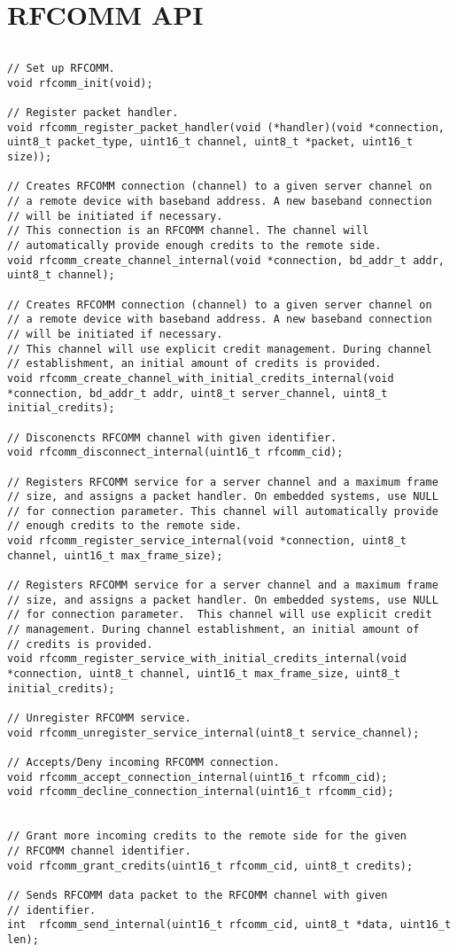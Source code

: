 \section{RFCOMM API}
\label{appendix:api_rfcomm}
$ $
\begin{lstlisting}
// Set up RFCOMM.
void rfcomm_init(void);

// Register packet handler.
void rfcomm_register_packet_handler(void (*handler)(void *connection, uint8_t packet_type, uint16_t channel, uint8_t *packet, uint16_t size));

// Creates RFCOMM connection (channel) to a given server channel on 
// a remote device with baseband address. A new baseband connection 
// will be initiated if necessary.
// This connection is an RFCOMM channel. The channel will 
// automatically provide enough credits to the remote side.
void rfcomm_create_channel_internal(void *connection, bd_addr_t addr, uint8_t channel);

// Creates RFCOMM connection (channel) to a given server channel on
// a remote device with baseband address. A new baseband connection
// will be initiated if necessary. 
// This channel will use explicit credit management. During channel 
// establishment, an initial amount of credits is provided.
void rfcomm_create_channel_with_initial_credits_internal(void *connection, bd_addr_t addr, uint8_t server_channel, uint8_t initial_credits);

// Disconencts RFCOMM channel with given identifier. 
void rfcomm_disconnect_internal(uint16_t rfcomm_cid);

// Registers RFCOMM service for a server channel and a maximum frame 
// size, and assigns a packet handler. On embedded systems, use NULL 
// for connection parameter. This channel will automatically provide 
// enough credits to the remote side.
void rfcomm_register_service_internal(void *connection, uint8_t channel, uint16_t max_frame_size);

// Registers RFCOMM service for a server channel and a maximum frame
// size, and assigns a packet handler. On embedded systems, use NULL 
// for connection parameter.  This channel will use explicit credit
// management. During channel establishment, an initial amount of 
// credits is provided.
void rfcomm_register_service_with_initial_credits_internal(void *connection, uint8_t channel, uint16_t max_frame_size, uint8_t initial_credits);

// Unregister RFCOMM service.
void rfcomm_unregister_service_internal(uint8_t service_channel);

// Accepts/Deny incoming RFCOMM connection.
void rfcomm_accept_connection_internal(uint16_t rfcomm_cid);
void rfcomm_decline_connection_internal(uint16_t rfcomm_cid);


// Grant more incoming credits to the remote side for the given 
// RFCOMM channel identifier.
void rfcomm_grant_credits(uint16_t rfcomm_cid, uint8_t credits);

// Sends RFCOMM data packet to the RFCOMM channel with given
// identifier.
int  rfcomm_send_internal(uint16_t rfcomm_cid, uint8_t *data, uint16_t len); 
\end{lstlisting}
\pagebreak